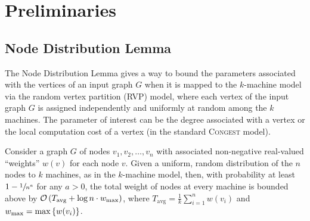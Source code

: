 \section{Preliminaries}

\subsection{Node Distribution Lemma}\label{sec:conv-the}

The Node Distribution Lemma gives a way to bound the parameters associated with
the vertices of an input graph $G$ when it is mapped to the $k$-machine model via
the random vertex partition (RVP) model, where each vertex of the input graph $G$
is assigned independently and uniformly at random among the $k$ machines.
 The parameter of interest can be the degree associated with a vertex or the local computation
cost of a vertex (in the standard \textsc{Congest} model).

\begin{lemma}
    \label{lem:node-distribution-lemma}
    Consider a graph \(G\) of nodes \(v_1, v_2, \hdots, v_n\) with associated non-negative real-valued ``weights'' \(w(v)\) for each node \(v\). Given a uniform, random distribution of the \(n\) nodes to \(k\) machines, as in the \(k\)-machine model, then, with probability at least $1 - \sfrac{1}{n^a}$ for any $a > 0$, the total weight of nodes at every machine is bounded above by $\mathcal{O}\left(T_{\text{avg}}+\log{n}\cdot w_{\max}\right)$, where \(T_{\text{avg}}=\frac{1}{k}\sum_{i=1}^n w(v_i)\) and \(w_{\max}=\max\left\lbrace w(v_i)\right\rbrace\).
\end{lemma}


